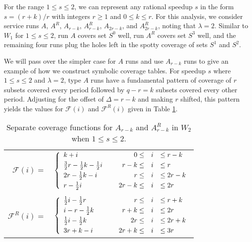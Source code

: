 \documentclass[11pt]{article}
\begin{document}
For the range $1 \leq s \leq 2$, we can represent any rational speedup $s$ in the form $s = (r + k)/r$ with integers $r \geq 1$ and $0 \leq k \leq r$.  For this analysis, we consider service runs $A$, $A^R$, $A_{r - k}$, $A_{r - k}^R$, $A_{2r - k}$, and $A_{2r - k}^R$, noting that $\lambda = 2$.  Similar to $W_1$ for $1 \leq s \leq 2$, run $A$ covers set $S^0$ well, run $A^R$ covers set $S^3$ well, and the remaining four runs plug the holes left in the spotty coverage of sets $S^1$ and $S^2$.

We will pass over the simpler case for $A$ runs and use $A_{r - k}$ runs to give an example of how we construct symbolic coverage tables.  For speedup $s$ where $1 \leq s \leq 2$ and $\lambda = 2$, type $A$ runs have a fundamental pattern of coverage of $r$ subsets covered every period followed by $q - r = k$ subsets covered every other period.  Adjusting for the offset of $\Delta = r - k$ and making $r$ shifted, this pattern yields the values for $\mathcal{F}(i)$ and $\mathcal{F}^R(i)$ given in Table \ref{table:F functions for A_r-k runs}.


\begin{table}[!hbt]
\begin{center}
\begin{tabular}{rll}
$\mathcal{F}(i) = $ & $\left\{ \begin{array}{l}
k + i \smallskip \\ 
{3 \over 2}r - {1\over 2}k - {1\over 2}i \smallskip \\ 
2r - {1\over 2}k - i \smallskip \\
r - {1\over 2}i
\end{array} \right.$ &
$\begin{array}{rcl}
0 \leq &i& \leq r - k \smallskip \\ 
r - k \leq &i& \leq r \smallskip \\
r \leq &i& \leq 2r - k \smallskip \\
2r - k \leq &i& \leq 2r
\end{array}$
\\ \\
$\mathcal{F}^R(i) = $ & $\left\{ \begin{array}{l}
{1\over 2}i - {1\over 2}r \smallskip \\ 
i - r - {1\over 2}k \smallskip \\ 
{1\over 2}i - {1\over 2}k \smallskip \\
3r + k - i
\end{array} \right.$ &
$\begin{array}{rcl}
r \leq &i& \leq r + k \smallskip \\ 
r + k \leq &i& \leq 2r \smallskip \\
2r \leq &i& \leq 2r + k \smallskip \\
2r + k \leq &i& \leq 3r
\end{array}$
\end{tabular}
\end{center}
\caption{Separate coverage functions for $A_{r-k}$ and $A_{r-k}^R$ in $W_2$ when $1 \leq s \leq 2$.}
\label{table:F functions for A_r-k runs} 
\end{table}
\end{document}
